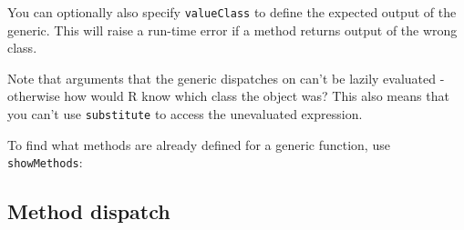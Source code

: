 You can optionally also specify \texttt{valueClass} to define the
expected output of the generic. This will raise a run-time error if a
method returns output of the wrong class.

\begin{Shaded}
\begin{Highlighting}[]
\NormalTok{(}\NormalTok{, } \NormalTok{, }
  \NormalTok{(}\NormalTok{)}
\NormalTok{\})}
\NormalTok{(}\NormalTok{, }\NormalTok{(}\NormalTok{), }\NormalTok{)}
\NormalTok{(}\NormalTok{(}\NormalTok{))}
\end{Highlighting}
\end{Shaded}

Note that arguments that the generic dispatches on can't be lazily
evaluated - otherwise how would R know which class the object was? This
also means that you can't use \texttt{substitute} to access the
unevaluated expression.

To find what methods are already defined for a generic function, use
\texttt{showMethods}:

\begin{Shaded}
\begin{Highlighting}[]
\NormalTok{(}\NormalTok{)}
    
\NormalTok{(} \NormalTok{)}
\CommentTok{# }
\end{Highlighting}
\end{Shaded}

\hypertarget{method-dispatch}{%
\subsection{Method dispatch}\label{method-dispatch}}

